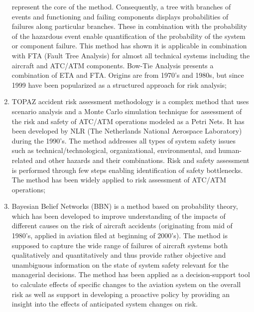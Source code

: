 \documentclass[a4paper, 10pt]{article}
\begin{document}
\begin{enumerate}
				represent the core of the method. Consequently, a tree with
				branches of events and functioning and failing components
				displays probabilities of failures along particular branches.
				These in combination with the probability of the hazardous
				event enable quantification of the probability of the system or
				component failure. This method has shown it is applicable in
				combination with FTA (Fault Tree Analysis) for almost all
				technical systems including the aircraft and ATC/ATM
				components. Bow-Tie Analysis presents a combination of ETA
				and FTA. Origins are from 1970’s and 1980s, but since 1999
				have been popularized as a structured approach for risk
				analysis;
		\item TOPAZ accident risk assessment methodology is a
				complex method that uses scenario analysis and a Monte Carlo
				simulation technique for assessment of the risk and safety of
				ATC/ATM operations modeled as a Petri Nets. It has been
				developed by NLR (The Netherlands National Aerospace
				Laboratory) during the 1990’s. The method addresses all types
				of system safety issues such as technical/technological,
				organizational, environmental, and human-related and other
				hazards and their combinations. Risk and safety assessment is
				performed through few steps enabling identification of safety
				bottlenecks. The method has been widely applied to risk
				assessment of ATC/ATM operations;
		\item Bayesian Belief Networks (BBN) is a method based
				on probability theory, which has been developed to improve
				understanding of the impacts of different causes on the risk of
				aircraft accidents (originating from mid of 1980’s, applied in
				aviation filed at beginning of 2000’s). The method is supposed
				to capture the wide range of failures of aircraft systems both
				qualitatively and quantitatively and thus provide rather
				objective and unambiguous information on the state of system
				safety relevant for the managerial decisions. The
				method has been applied as a decision-support tool to calculate
				effects of specific changes to the aviation system on the overall
				risk as well as support in developing a proactive policy by
				providing an insight into the effects of anticipated system
				changes on risk.
\end{enumerate} \par
\end{document}

